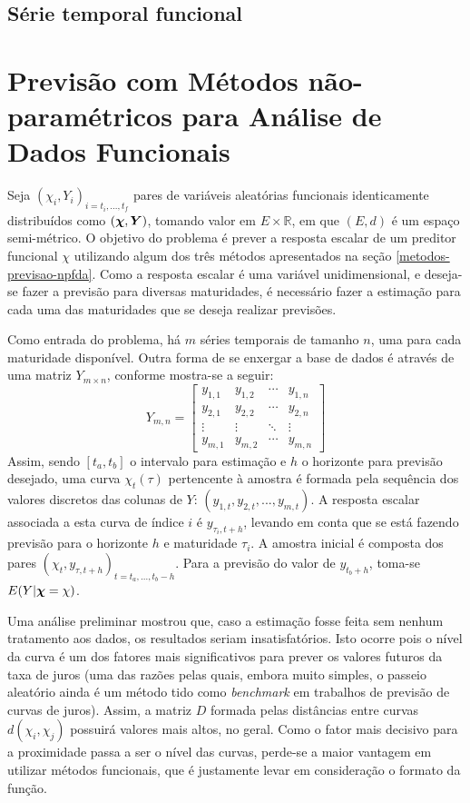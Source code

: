 \documentclass[
	12pt,				%
	openright,			%
	oneside,			%
	a4paper,			%
	english,			%
	brazil				%
	]{dissertacao-ufrgs-abntex2}
\begin{document}
\subsection{Série temporal funcional}


\section{Previsão com Métodos não-paramétricos para Análise de Dados Funcionais} \label{metodologia-npfda}

Seja $(\chi_i,Y_i)_{i=t_i,...,t_f}$ pares de variáveis aleatórias funcionais identicamente distribuídos como $(\boldsymbol{\chi},\boldsymbol{Y})$, tomando valor em $E \times \mathbb{R}$, em que $(E,d)$ é um espaço semi-métrico. O objetivo do problema é prever a resposta escalar de um preditor funcional $\chi$ utilizando algum dos três métodos apresentados na seção \ref{metodos-previsao-npfda}. Como a resposta escalar é uma variável unidimensional, e deseja-se fazer a previsão para diversas maturidades, é necessário fazer a estimação para cada uma das maturidades que se deseja realizar previsões.

Como entrada do problema, há $m$ séries temporais de tamanho $n$, uma para cada maturidade disponível. Outra forma de se enxergar a base de dados é através de uma matriz $Y_{m \times n}$, conforme mostra-se a seguir:
\begin{equation} 
Y_{m,n} = 
 \begin{bmatrix}
	  y_{1,1} & y_{1,2} & \cdots & y_{1,n} \\
	  y_{2,1} & y_{2,2} & \cdots & y_{2,n} \\
	  \vdots  & \vdots  & \ddots & \vdots  \\
	  y_{m,1} & y_{m,2} & \cdots & y_{m,n}
 \end{bmatrix}
\end{equation}
Assim, sendo $[t_a,t_b]$ o intervalo para estimação e $h$ o horizonte para previsão desejado, uma  curva $\chi_t(\tau)$ pertencente à amostra é formada pela sequência dos valores discretos das colunas de $Y$: $(y_{1,t},y_{2,t}, ... , y_{m,t})$. A resposta escalar associada a esta curva de índice $i$ é $y_{\tau_i,t + h}$, levando em conta que se está fazendo previsão para o horizonte $h$ e maturidade $\tau_i$. A amostra inicial é composta dos pares $(\chi_t,y_{\tau,t+h})_{t=t_a,...,t_b-h}$. Para a previsão do valor de $y_{t_b+h}$, toma-se $E(Y|\boldsymbol{\chi}=\chi)$. 

Uma análise preliminar mostrou que, caso a estimação fosse feita sem nenhum tratamento aos dados, os resultados seriam insatisfatórios. Isto ocorre pois o nível da curva é um dos fatores mais significativos para prever os valores futuros da taxa de juros (uma das razões pelas quais, embora muito simples, o passeio aleatório ainda é um método tido como \emph{benchmark} em trabalhos de previsão de curvas de juros). Assim, a matriz $D$ formada pelas distâncias entre curvas $d(\chi_i,\chi_j)$ possuirá valores mais altos, no geral. Como o fator mais decisivo para a proximidade passa a ser o nível das curvas, perde-se a maior vantagem em utilizar métodos funcionais, que é justamente levar em consideração o formato da função.
\end{document}
